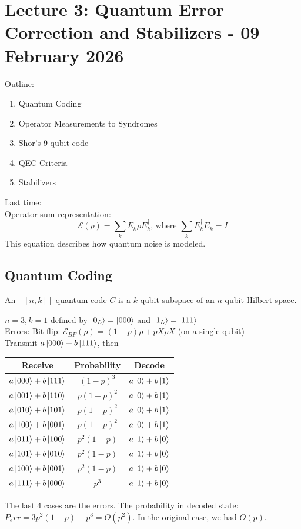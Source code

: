 \section{Lecture 3: Quantum Error Correction and Stabilizers - 09 February 2026}
Outline:
\begin{enumerate}[label=(\Roman*)]
    \item Quantum Coding
    \item Operator Measurements to Syndromes
    \item Shor's 9-qubit code
    \item QEC Criteria
    \item Stabilizers
\end{enumerate}

Last time: \\
Operator sum representation:
\begin{equation}
    \mathcal{E}(\rho) = \sum_k E_k \rho E_k^\dagger \text{, where } \sum_k E_k^\dagger E_k = I
\end{equation}
This equation describes how quantum noise is modeled. 

\subsection{Quantum Coding}
\begin{definition}
    An $[[n,k]]$ quantum code $C$ is a $k$-qubit subspace of an $n$-qubit Hilbert space. 
\end{definition}
\begin{example}
    $n = 3, k=1$ defined by $\ket{0_L} = \ket{000}$ and $\ket{1_L} = \ket{111}$ \\
    Errors: Bit flip: $\mathcal{E}_{BF}(\rho) = (1-p) \rho + p X\rho X$ (on a single qubit) \\
    Transmit $a\ket{000} + b\ket{111}$, then 
    \begin{center}
    \begin{tabular}{ c | c | c }
    Receive & Probability & Decode\\
    \hline
    $a\ket{000} + b\ket{111}$ & $(1 -p)^3$ & $a\ket{0} + b\ket{1}$ \\  
    $a\ket{001} + b\ket{110}$ & $p(1-p)^2$ & $a\ket{0} + b\ket{1}$ \\  
    $a\ket{010} + b\ket{101}$ & $p(1-p)^2$ & $a\ket{0} + b\ket{1}$ \\  
    $a\ket{100} + b\ket{001}$ & $p(1-p)^2$ & $a\ket{0} + b\ket{1}$ \\  
    $a\ket{011} + b\ket{100}$ & $p^2(1-p)$ & $a\ket{1} + b\ket{0}$ \\  
    $a\ket{101} + b\ket{010}$ & $p^2(1-p)$ & $a\ket{1} + b\ket{0}$ \\  
    $a\ket{100} + b\ket{001}$ & $p^2(1-p)$  & $a\ket{1} + b\ket{0}$\\  
    $a\ket{111} + b\ket{000}$ & $p^3$ & $a\ket{1} + b\ket{0}$
    \end{tabular}
    \end{center}
    The last 4 cases are the errors. The probability in decoded state:
    $P_err= 3p^2(1-p) + p^3 = O(p^2)$. In the original case, we had $O(p)$. 
\end{example}



